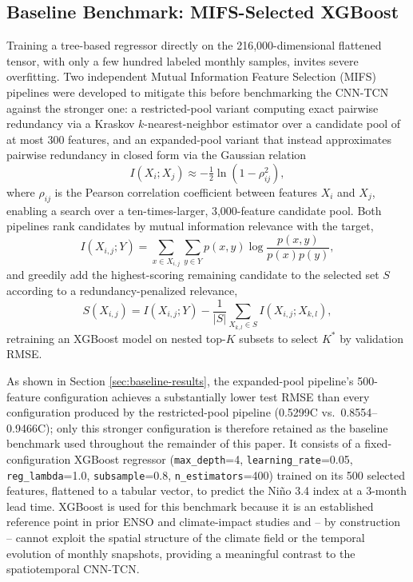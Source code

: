 \documentclass[conference]{IEEEtran}
\begin{document}
\subsection{Baseline Benchmark: MIFS-Selected XGBoost}
\label{sec:baseline}
Training a tree-based regressor directly on the 216,000-dimensional flattened tensor, with only a few hundred labeled monthly samples, invites severe overfitting. Two independent Mutual Information Feature Selection (MIFS) \cite{battiti1994} pipelines were developed to mitigate this before benchmarking the CNN-TCN against the stronger one: a restricted-pool variant computing exact pairwise redundancy via a Kraskov $k$-nearest-neighbor estimator \cite{kraskov2004} over a candidate pool of at most 300 features, and an expanded-pool variant that instead approximates pairwise redundancy in closed form via the Gaussian relation
\begin{equation}
I(X_i;X_j) \approx -\tfrac{1}{2}\ln\!\left(1-\rho_{ij}^2\right),
\label{eq:gaussian}
\end{equation}
where $\rho_{ij}$ is the Pearson correlation coefficient between features $X_i$ and $X_j$, enabling a search over a ten-times-larger, 3,000-feature candidate pool. Both pipelines rank candidates by mutual information relevance with the target,
\begin{equation}
I(X_{i,j};Y) = \sum_{x\in X_{i,j}}\sum_{y\in Y} p(x,y)\log\frac{p(x,y)}{p(x)p(y)},
\label{eq:mi}
\end{equation}
and greedily add the highest-scoring remaining candidate to the selected set $S$ according to a redundancy-penalized relevance,
\begin{equation}
S(X_{i,j}) = I(X_{i,j};Y) - \frac{1}{|S|}\sum_{X_{k,l}\in S} I(X_{i,j};X_{k,l}),
\label{eq:mifs}
\end{equation}
retraining an XGBoost model on nested top-$K$ subsets to select $K^*$ by validation RMSE.

As shown in Section \ref{sec:baseline-results}, the expanded-pool pipeline's 500-feature configuration achieves a substantially lower test RMSE than every configuration produced by the restricted-pool pipeline (0.5299\textdegree C vs.\ 0.8554--0.9466\textdegree C); only this stronger configuration is therefore retained as the baseline benchmark used throughout the remainder of this paper. It consists of a fixed-configuration XGBoost regressor (\texttt{max\_depth}=4, \texttt{learning\_rate}=0.05, \texttt{reg\_lambda}=1.0, \texttt{subsample}=0.8, \texttt{n\_estimators}=400) trained on its 500 selected features, flattened to a tabular vector, to predict the Ni\~no 3.4 index at a 3-month lead time. XGBoost is used for this benchmark because it is an established reference point in prior ENSO and climate-impact studies and -- by construction -- cannot exploit the spatial structure of the climate field or the temporal evolution of monthly snapshots, providing a meaningful contrast to the spatiotemporal CNN-TCN.
\end{document}
